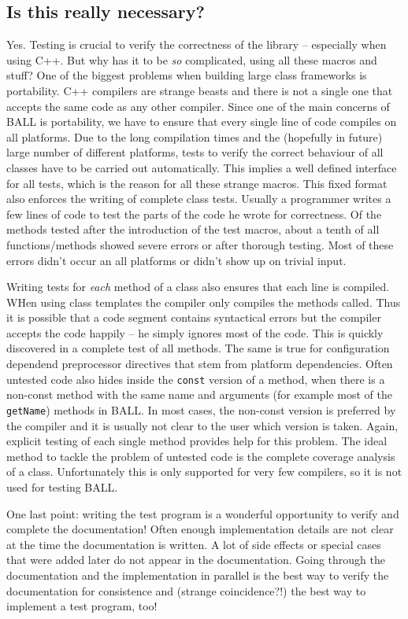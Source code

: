 \documentclass[a4]{article}
\begin{document}
\subsection{Is this really necessary?}

Yes. Testing is crucial to verify the correctness of the library -- especially when
using C++. But why has it to be {\em so} complicated, using all these macros
and stuff? One of the biggest problems when building large class frameworks is
portability. C++ compilers are strange beasts and there is not a single one
that accepts the same code as any other compiler. Since one of the main
concerns of BALL is portability, we have to ensure that every single line of
code compiles on all platforms. Due to the long compilation times and the
(hopefully in future) large number of different platforms, tests to verify the
correct behaviour of all classes have to be carried out automatically. This
implies a well defined interface for all tests, which is the reason for all
these strange macros. This fixed format also enforces the writing of complete
class tests. Usually a programmer writes a few lines of code to test the parts
of the code he wrote for correctness. Of the methods tested after the
introduction of the test macros, about a tenth of all functions/methods showed
severe errors or after thorough testing. Most of these errors didn't occur an
all platforms or didn't show up on trivial input.

Writing tests for {\em each} method of a class also ensures that each line is
compiled. WHen using class templates the compiler only compiles the methods
called. Thus it is possible that a code segment contains syntactical errors
but the compiler accepts the code happily -- he simply ignores most of the
code. This is quickly discovered in a complete test of all methods. The same
is true for configuration dependend preprocessor directives that stem from
platform dependencies. Often untested code also hides inside the {\tt const}
version of a method, when there is a non-const method with the same name and
arguments (for example most of the {\tt getName}) methods in BALL. In most
cases, the non-const version is preferred by the compiler and it is usually
not clear to the user which version is taken. Again, explicit testing of each
single method provides help for this problem.
The ideal method to tackle the problem of untested code is the complete
coverage analysis of a class. Unfortunately this is only supported for very
few compilers, so it is not used for testing BALL.

One last point: writing the
test program is a wonderful opportunity to verify and complete the
documentation! Often enough implementation details are not clear at the time
the documentation is written. A lot of side effects or special cases that were
added later do not appear in the documentation. Going through the
documentation and the implementation in parallel is the best way to verify the
documentation for consistence and (strange coincidence?!) the best way to
implement a test program, too!
\end{document}
